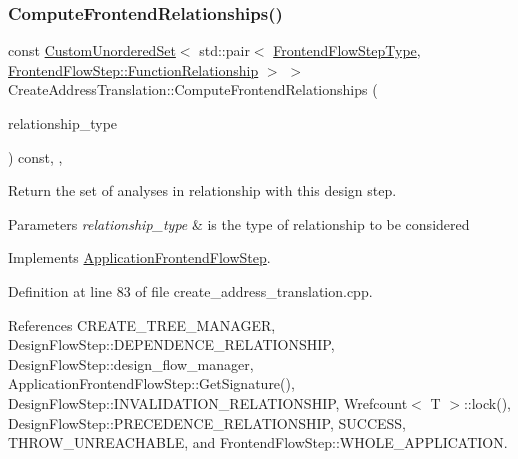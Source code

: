 \subsubsection{\texorpdfstring{Compute\+Frontend\+Relationships()}{ComputeFrontendRelationships()}}
{\footnotesize\ttfamily const \hyperlink{classCustomUnorderedSet}{Custom\+Unordered\+Set}$<$ std\+::pair$<$ \hyperlink{frontend__flow__step_8hpp_afeb3716c693d2b2e4ed3e6d04c3b63bb}{Frontend\+Flow\+Step\+Type}, \hyperlink{classFrontendFlowStep_af7cf30f2023e5b99e637dc2058289ab0}{Frontend\+Flow\+Step\+::\+Function\+Relationship} $>$ $>$ Create\+Address\+Translation\+::\+Compute\+Frontend\+Relationships (\begin{DoxyParamCaption}\item[{const \hyperlink{classDesignFlowStep_a723a3baf19ff2ceb77bc13e099d0b1b7}{Design\+Flow\+Step\+::\+Relationship\+Type}}]{relationship\+\_\+type }\end{DoxyParamCaption}) const\hspace{0.3cm}{\ttfamily [override]}, {\ttfamily [protected]}, {\ttfamily [virtual]}}



Return the set of analyses in relationship with this design step. 


\begin{DoxyParams}{Parameters}
{\em relationship\+\_\+type} & is the type of relationship to be considered \\
\hline
\end{DoxyParams}


Implements \hyperlink{classApplicationFrontendFlowStep_ab308200c0096ccff3a1ff50e864ed61f}{Application\+Frontend\+Flow\+Step}.



Definition at line 83 of file create\+\_\+address\+\_\+translation.\+cpp.



References C\+R\+E\+A\+T\+E\+\_\+\+T\+R\+E\+E\+\_\+\+M\+A\+N\+A\+G\+ER, Design\+Flow\+Step\+::\+D\+E\+P\+E\+N\+D\+E\+N\+C\+E\+\_\+\+R\+E\+L\+A\+T\+I\+O\+N\+S\+H\+IP, Design\+Flow\+Step\+::design\+\_\+flow\+\_\+manager, Application\+Frontend\+Flow\+Step\+::\+Get\+Signature(), Design\+Flow\+Step\+::\+I\+N\+V\+A\+L\+I\+D\+A\+T\+I\+O\+N\+\_\+\+R\+E\+L\+A\+T\+I\+O\+N\+S\+H\+IP, Wrefcount$<$ T $>$\+::lock(), Design\+Flow\+Step\+::\+P\+R\+E\+C\+E\+D\+E\+N\+C\+E\+\_\+\+R\+E\+L\+A\+T\+I\+O\+N\+S\+H\+IP, S\+U\+C\+C\+E\+SS, T\+H\+R\+O\+W\+\_\+\+U\+N\+R\+E\+A\+C\+H\+A\+B\+LE, and Frontend\+Flow\+Step\+::\+W\+H\+O\+L\+E\+\_\+\+A\+P\+P\+L\+I\+C\+A\+T\+I\+ON.

